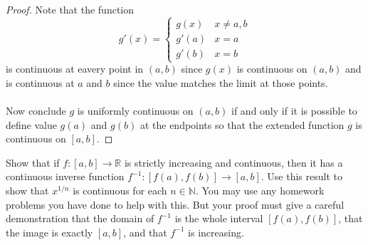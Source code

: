 \documentclass[12pt]{article}
\makeatletter
\theoremstyle{homework}
\newenvironment{exercise}[1]
{\def\@currentlabel{#1}\exercisecore}
{\endexercisecore}
\makeatother
\begin{document}
\begin{enumerate}[(a)]
\begin{proof}
Note that the function $$g'(x)=\begin{cases} g(x) & x\neq a,b\\ g'(a) & x=a\\ g'(b) & x=b\end{cases}$$ is continuous at eavery point in $(a,b)$ since $g(x)$ is continuous on $(a,b)$ and is continuous at $a$ and $b$ since the value matches the limit at those points.\\\\
Now conclude $g$ is uniformly continuous on $(a, b)$ if and only if it is possible to define value $g(a)$ and $g(b)$ at the endpoints so that the extended function $g$ is continuous on $[a, b]$.
\end{proof}
\end{enumerate}
\begin{exercise} 7
Show that if $f : [a, b] \rightarrow \mathbb{R}$ is strictly increasing and continuous, then it has
a continuous inverse function $f^{-1}: [f(a), f(b)] \rightarrow [a, b]$. Use this result to show that $x^{1/n}$
is
continuous for each $n \in \mathbb{N}$. You may use any homework problems you have done to help
with this. But your proof must give a careful demonstration that the domain of $f^{-1}$
is the
whole interval $[f(a), f(b)]$, that the image is exactly $[a, b]$, and that $f^{-1}$
is increasing.
\end{exercise}
\end{document}
